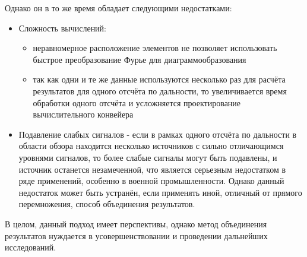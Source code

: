 Однако он в то же время обладает следующими недостатками:

\begin{itemize}
    \item Сложность вычислений:
    \begin{itemize}
        \item неравномерное расположение элементов не позволяет использовать быстрое 
        преобразование Фурье для диаграммообразования
        \item так как одни и те же данные используются несколько раз для расчёта результатов для одного отсчёта по 
        дальности, то увеличивается время обработки одного отсчёта и усложняется 
        проектирование вычислительного конвейера
    \end{itemize}
    \item Подавление слабых сигналов - если в рамках одного отсчёта по дальности в области обзора находится несколько 
    источников с сильно отличающимся уровнями сигналов, то более слабые сигналы могут быть подавлены, и источник останется 
    незамеченной, что является серьезным недостатком в ряде применений, особенно в военной промышленности. Однако данный 
    недостаток может быть устранён, если применять иной, отличный от прямого перемножения, способ объединения результатов.
\end{itemize}

В целом, данный подход имеет перспективы, однако метод объединения результатов нуждается 
в усовершенствовании и проведении дальнейших исследований. 

